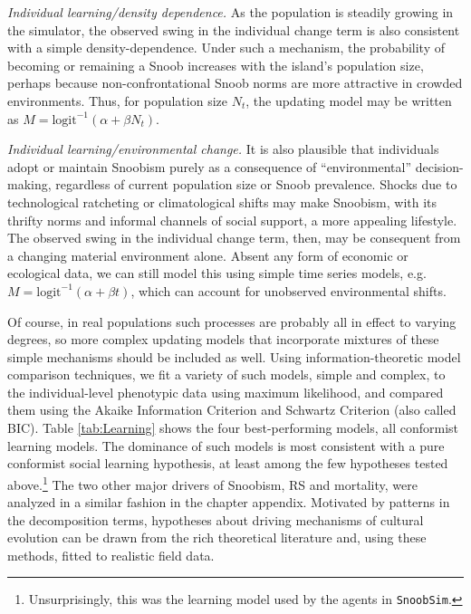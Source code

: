 \textit{Individual learning/density dependence.}  As the population is steadily growing in the simulator, the observed swing in the individual change term is also consistent with a simple density-dependence.  Under such a mechanism, the probability of becoming or remaining a Snoob increases with the island's population size, perhaps because non-confrontational Snoob norms are more attractive in crowded environments.  Thus, for population size $N_t$, the updating model may be written as $M=\mathrm{logit}^{-1}(\alpha + \beta N_t)$.  

\textit{Individual learning/environmental change.}  It is also plausible that individuals adopt or maintain Snoobism purely as a consequence of ``environmental'' decision-making, regardless of current population size or Snoob prevalence. Shocks due to technological ratcheting or climatological shifts may make Snoobism, with its thrifty norms and informal channels of social support, a more appealing lifestyle.  The observed swing in the individual change term, then, may be consequent from a changing material environment alone.  Absent any form of economic or ecological data, we can still model this using simple time series models, e.g. $M=\mathrm{logit}^{-1}(\alpha + \beta t)$, which can account for unobserved environmental shifts. 

Of course, in real populations such processes are probably all in effect to varying degrees, so more complex updating models that incorporate mixtures of these simple mechanisms should be included as well.  Using information-theoretic model comparison techniques, we fit a variety of such models, simple and complex, to the individual-level phenotypic data using maximum likelihood, and compared them using the Akaike Information Criterion and Schwartz Criterion (also called BIC).  Table \ref{tab:Learning} shows the four best-performing models, all conformist learning models.  The dominance of such models is most consistent with a pure conformist social learning hypothesis, at least among the few hypotheses tested above.\footnote{Unsurprisingly, this was the learning model used by the agents in \texttt{SnoobSim}.}  The two other major drivers of Snoobism, RS and mortality, were analyzed in a similar fashion in the chapter appendix.  Motivated by patterns in the decomposition terms, hypotheses about driving mechanisms of cultural evolution can be drawn from the rich theoretical literature and, using these methods, fitted to realistic field data.

